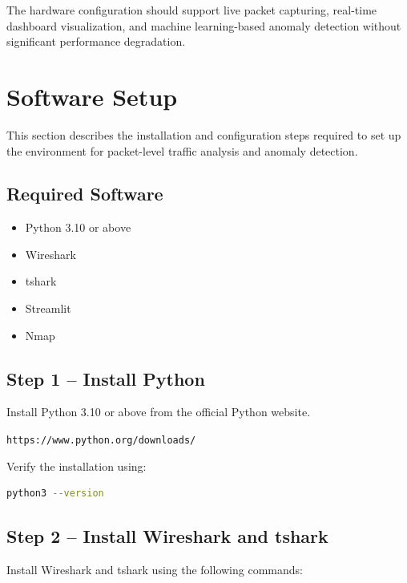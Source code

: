 \documentclass[12pt,a4paper]{article}
\begin{document}
	The hardware configuration should support live packet capturing, real-time dashboard visualization, and machine learning-based anomaly detection without significant performance degradation.
	\newpage
	\section{Software Setup}
	
	This section describes the installation and configuration steps required to set up the environment for packet-level traffic analysis and anomaly detection.
	
	\subsection*{Required Software}
	
	\begin{itemize}
		\item Python 3.10 or above
		\item Wireshark
		\item tshark
		\item Streamlit
		\item Nmap
	\end{itemize}
	
	\vspace{0.02cm}
	
	\subsection*{Step 1 -- Install Python}
	
	Install Python 3.10 or above from the official Python website.
	
	\begin{center}
		\texttt{https://www.python.org/downloads/}
	\end{center}
	
	Verify the installation using:
	
	\begin{lstlisting}[language=bash]
		python3 --version
	\end{lstlisting}
	
	\vspace{0.5cm}
	
	\subsection*{Step 2 -- Install Wireshark and tshark}
	
	Install Wireshark and tshark using the following commands:
	
\end{document}
